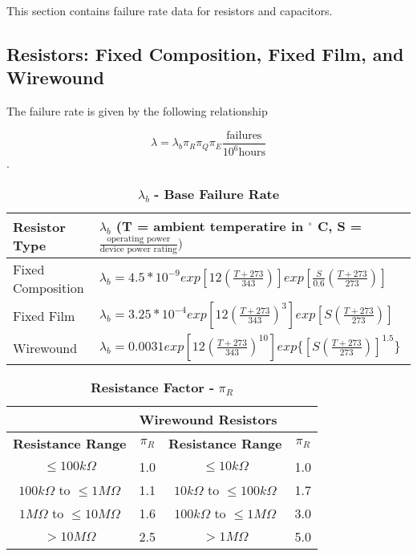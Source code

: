 This section contains failure rate data for resistors and capacitors.

\subsection{Resistors: Fixed Composition, Fixed Film, and Wirewound}
\label{section:resistors-fixed-composition-fixed-film-and-wirewound}

The failure rate is given by the following relationship

$$\lambda = \lambda_{b} \pi_{R} \pi_{Q} \pi_{E} \frac{\text{failures}}{10^{6} \text{hours}}$$.


\begin{table}[h]
\caption{$\lambda_{b} $ \textbf{- Base Failure Rate}}
\label{table:baseFailureRate}
\begin{tabular}{|l|m{10cm}|} \hline
\rowcolor{Gray}
\textbf{Resistor Type} &
$\lambda_b$ 
(T = ambient temperatire in $^\circ$ C, 
S = $\frac{\text{operating power}}{\text{device power rating}})$ \\ \hline
Fixed Composition & 
$\lambda_b = 4.5*10^{-9} exp [12(\frac{T+273}{343})] exp[\frac{S}{0.6}(\frac{T+273}{273})]$ \\ \hline
Fixed Film &
$\lambda_b = 3.25*10^{-4} exp [12(\frac{T+273}{343})^3] exp[S(\frac{T+273}{273})]$ \\ \hline
Wirewound &
$\lambda_b = 0.0031 exp [12(\frac{T+273}{343})^{10}] exp\{[S(\frac{T+273}{273})]^{1.5}\}$ \\ \hline
\end{tabular}
\end{table}




\begin{table}[h]
\caption{\textbf{Resistance Factor -} $\pi_{R}$}
\label{table:resistanceFactor}
\begin{tabular}{|c|c|c|c|} \hline
\rowcolor{Gray}
\multicolumn{2}{|l|}{\textbf{Fixed Composition or Fixed Film Resistors}} &  \multicolumn{2}{|l|}{\textbf{Wirewound Resistors}} \\ \hline
\rowcolor{Gray}
\textbf{Resistance Range} & $\pi_{R}$ & \textbf{Resistance Range} & $\pi_{R}$ \\ \hline
$ \leq 100k\Omega$                            & 1.0 & $ \leq 10k\Omega$                                     & 1.0 \\ \hline
$ 100k\Omega$ to $\leq 1M\Omega$ & 1.1 & $ 10k\Omega$ to $\leq 100k\Omega$  & 1.7 \\ \hline
$ 1M\Omega$ to $\leq 10M\Omega$  & 1.6 & $ 100k\Omega$ to $\leq 1M\Omega$  & 3.0 \\ \hline
$ > 10M\Omega$                                 & 2.5 & $ > 1M\Omega$                                     & 5.0 \\ \hline
\end{tabular}
\end{table}



